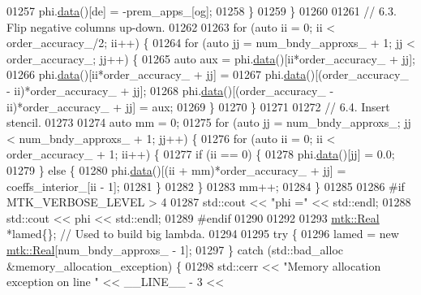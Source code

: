 \begin{DoxyCode}
{{01257         phi.\hyperlink{classmtk_1_1DenseMatrix_a0c33b8a9e01d157c61ddbdf807c25d84}{data}()[de] = -prem\_apps\_[og];
01258       \}
01259     \}
01260 
01261     \textcolor{comment}{// 6.3. Flip negative columns up-down.}
01262 
01263     \textcolor{keywordflow}{for} (\textcolor{keyword}{auto} ii = 0; ii < order\_accuracy\_/2; ii++) \{
01264       \textcolor{keywordflow}{for} (\textcolor{keyword}{auto} jj = num\_bndy\_approxs\_ + 1; jj < order\_accuracy\_; jj++) \{
01265         \textcolor{keyword}{auto} aux = phi.\hyperlink{classmtk_1_1DenseMatrix_a0c33b8a9e01d157c61ddbdf807c25d84}{data}()[ii*order\_accuracy\_ + jj];
01266         phi.\hyperlink{classmtk_1_1DenseMatrix_a0c33b8a9e01d157c61ddbdf807c25d84}{data}()[ii*order\_accuracy\_ + jj] =
01267           phi.\hyperlink{classmtk_1_1DenseMatrix_a0c33b8a9e01d157c61ddbdf807c25d84}{data}()[(order\_accuracy\_ - ii)*order\_accuracy\_ + jj];
01268         phi.\hyperlink{classmtk_1_1DenseMatrix_a0c33b8a9e01d157c61ddbdf807c25d84}{data}()[(order\_accuracy\_ - ii)*order\_accuracy\_ + jj] = aux;
01269       \}
01270     \}
01271 
01272     \textcolor{comment}{// 6.4. Insert stencil.}
01273 
01274     \textcolor{keyword}{auto} mm = 0;
01275     \textcolor{keywordflow}{for} (\textcolor{keyword}{auto} jj = num\_bndy\_approxs\_; jj < num\_bndy\_approxs\_ +  1; jj++) \{
01276       \textcolor{keywordflow}{for} (\textcolor{keyword}{auto} ii = 0; ii < order\_accuracy\_ + 1; ii++) \{
01277         \textcolor{keywordflow}{if} (ii == 0) \{
01278           phi.\hyperlink{classmtk_1_1DenseMatrix_a0c33b8a9e01d157c61ddbdf807c25d84}{data}()[jj] = 0.0;
01279         \} \textcolor{keywordflow}{else} \{
01280           phi.\hyperlink{classmtk_1_1DenseMatrix_a0c33b8a9e01d157c61ddbdf807c25d84}{data}()[(ii + mm)*order\_accuracy\_ + jj] = coeffs\_interior\_[ii - 1];
01281         \}
01282       \}
01283       mm++;
01284     \}
01285 
01286 \textcolor{preprocessor}{    #if MTK\_VERBOSE\_LEVEL > 4}
01287     std::cout << \textcolor{stringliteral}{"phi ="} << std::endl;
01288     std::cout << phi << std::endl;
01289 \textcolor{preprocessor}{    #endif}
01290 
01292 
01293     \hyperlink{group__c01-roots_gac080bbbf5cbb5502c9f00405f894857d}{mtk::Real} *lamed\{\};  \textcolor{comment}{// Used to build big lambda.}
01294 
01295     \textcolor{keywordflow}{try} \{
01296       lamed = \textcolor{keyword}{new} \hyperlink{group__c01-roots_gac080bbbf5cbb5502c9f00405f894857d}{mtk::Real}[num\_bndy\_approxs\_ - 1];
01297     \} \textcolor{keywordflow}{catch} (std::bad\_alloc &memory\_allocation\_exception) \{
01298       std::cerr << \textcolor{stringliteral}{"Memory allocation exception on line "} << \_\_LINE\_\_ - 3 <<
}}
\end{DoxyCode}
